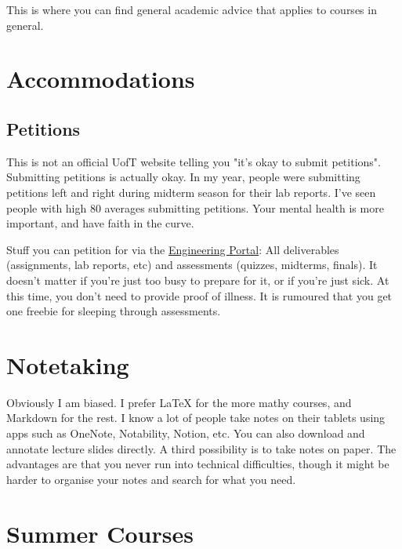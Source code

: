 This is where you can find general academic advice that applies to courses in general.

\section{Accommodations}

\subsection{Petitions}

This is not an official UofT website telling you "it's okay to submit petitions". Submitting petitions is actually okay. In my year, people were submitting petitions left and right during midterm season for their lab reports. I've seen people with high 80 averages submitting petitions. Your mental health is more important, and have faith in the curve.

Stuff you can petition for via the \href{https://www.google.com/url?sa=t&rct=j&q=&esrc=s&source=web&cd=&cad=rja&uact=8&ved=2ahUKEwjZj-qeh-7-AhX-kokEHX8-C8YQFnoECA0QAQ&url=http\%3A\%2F\%2Fundergrad.engineering.utoronto.ca\%2Fskule-\%2520\%2520\%2520\%2520\%2520\%2520\%2520\%2520\%2520\%2520\%2520\%2520life\%2Fthe-engineering-portal\%2F&usg=AOvVaw145xL8tAHUKBRq6D6rbDhS}{Engineering Portal}: All deliverables (assignments, lab reports, etc) and assessments (quizzes, midterms, finals). It doesn't matter if you're just too busy to prepare for it, or if you're just sick. At this time, you don't need to provide proof of illness. It is rumoured that you get one freebie for sleeping through assessments.

\section{Notetaking}

Obviously I am biased. I prefer LaTeX for the more mathy courses, and Markdown for the rest. I know a lot of people take notes on their tablets using apps such as OneNote, Notability, Notion, etc. You can also download and annotate lecture slides directly. A third possibility is to take notes on paper. The advantages are that you never run into technical difficulties, though it might be harder to organise your notes and search for what you need.

\section{Summer Courses}

